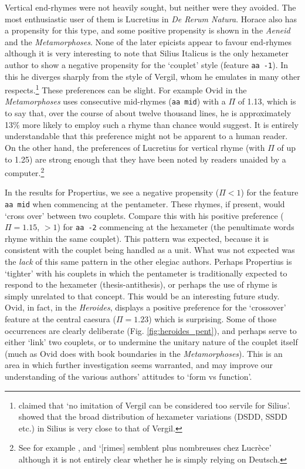 \documentclass[twocolumn, switch]{article} %
\begin{document}
Vertical end-rhymes were not heavily sought, but neither were they avoided.
The most enthusiastic user of them is Lucretius in \emph{De Rerum Natura}.
Horace also has a propensity for this type, and some positive propensity is shown
in the \emph{Aeneid} and the \emph{Metamorphoses}. None of the later epicists
appear to favour end-rhymes although it is very interesting to note that
Silius Italicus is the only hexameter author to show a negative propensity for
the `couplet' style (feature \texttt{aa -1}). In this he diverges sharply from
the style of Vergil, whom he emulates in many other respects.\footnote{
   claimed that `no imitation of Vergil can be
  considered too servile for Silius'.  showed
  that the broad distribution of hexameter variations (DSDD, SSDD etc.) in Silius
  is very close to that of Vergil.
}
These preferences can be slight. For example Ovid in the \emph{Metamorphoses}
uses consecutive mid-rhymes (\texttt{aa mid}) with a $\Pi$ of 1.13, which is
to say that, over the course of about twelve thousand lines, he is
approximately 13\% more likely to employ such a rhyme than chance would
suggest. It is entirely understandable that this preference might not be
apparent to a human reader. On the other hand, the preferences of Lucretius
for vertical rhyme (with $\Pi$ of up to 1.25) are strong enough that they have
been noted by readers unaided by a computer.\footnote{
  See for example , and
   `[rimes] semblent plus nombreuses chez
  Lucrèce' although it is not entirely clear whether he is simply relying on
  Deutsch.
}

In the results for Propertius, we see a negative propensity ($\Pi < 1$) for
the feature \texttt{aa mid} when commencing at the pentameter. These rhymes,
if present, would `cross over' between two couplets. Compare this with his
positive preference ($\Pi = 1.15$, $> 1$) for \texttt{aa -2} commencing at the
hexameter (the penultimate words rhyme within the same couplet). This pattern
was expected, because it is consistent with the couplet being handled as a
unit. What was not expected was the \emph{lack} of this same pattern in the
other elegiac authors. Perhaps Propertius is `tighter' with his couplets in
which the pentameter is traditionally expected to respond to the hexameter
(thesis-antithesis), or perhaps the use of rhyme is simply unrelated to that
concept. This would be an interesting future study. Ovid, in fact, in the
\emph{Heroides}, displays a positive preference for the `crossover' feature at
the central caesura ($\Pi=1.23$) which is surprising. Some of those
occurrences are clearly deliberate (Fig. \ref{fig:heroides_pent}), and perhaps
serve to either `link' two couplets, or to undermine the unitary nature of the
couplet itself (much as Ovid does with book boundaries in the
\emph{Metamorphoses}). This is an area in which further investigation seems
warranted, and may improve our understanding of the various authors' attitudes
to `form vs function'.
\end{document}
